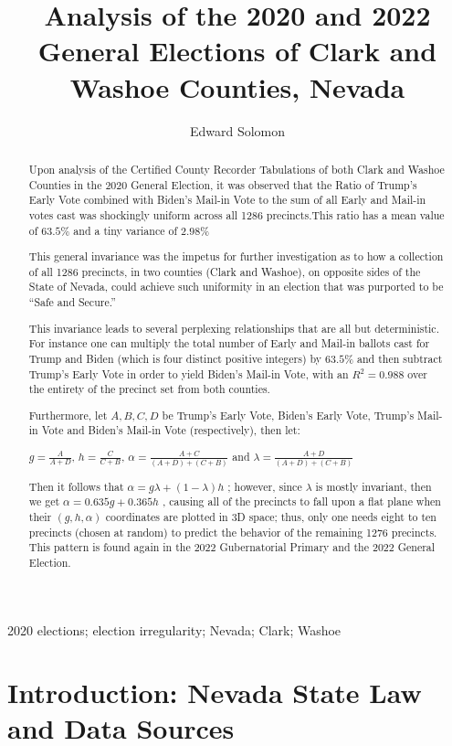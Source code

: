 \title{Analysis of the 2020 and 2022 General Elections of Clark and Washoe Counties, Nevada}
\author{Edward Solomon}
\begin{abstract}
Upon analysis of the Certified County Recorder Tabulations of both Clark and Washoe Counties in the 2020 General Election, it was observed that the Ratio of Trump’s Early Vote combined with Biden’s Mail-in Vote to the sum of all Early and Mail-in votes cast was shockingly uniform across all 1286 precincts.This ratio has a mean value of $63.5\%$ and a tiny variance of $2.98\%$

This general invariance was the impetus for further investigation as to how a collection of all 1286 precincts, in two counties (Clark and Washoe), on opposite sides of the State of Nevada, could achieve such uniformity in an election that was purported to be “Safe and Secure.”

This invariance leads to several perplexing relationships that are all but deterministic. For instance one can multiply the total number of Early and Mail-in ballots cast for Trump and Biden (which is four distinct positive integers) by $63.5\%$ and then subtract Trump's Early Vote in order to yield Biden's Mail-in Vote, with an $R^2=0.988$ over the entirety of the precinct set from both counties.

Furthermore, let $A, B, C, D$ be Trump's Early Vote, Biden's Early Vote, Trump's Mail-in Vote and Biden's Mail-in Vote (respectively), then let:

$g=\frac{A}{A+D}$, $h=\frac{C}{C+B}$, $\alpha=\frac{A+C}{(A+D)+(C+B)}$ and  $\lambda=\frac{A+D}{(A+D)+(C+B)}$

Then it follows that $\alpha=g\lambda + (1-\lambda)h$ ; however, since $\lambda$ is mostly invariant, then we get $\alpha=0.635g+0.365h$ , causing all of the precincts to fall upon a flat plane when their $(g,h,\alpha)$ coordinates are plotted in 3D space; thus, only one needs eight to ten precincts (chosen at random) to predict the behavior of the remaining 1276 precincts. This pattern is found again in the 2022 Gubernatorial Primary and the 2022 General Election.
\end{abstract}
\begin{keyword}
2020 elections; election irregularity; Nevada; Clark; Washoe
\end{keyword}
\newpage
\linenumbers
\section{Introduction: Nevada State Law and Data Sources}
